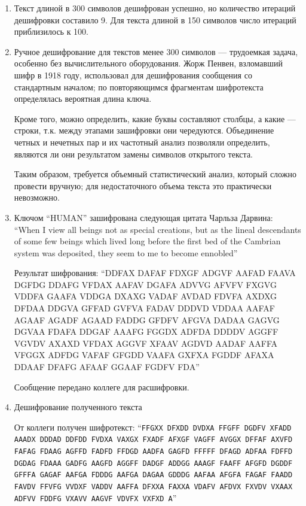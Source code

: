 \documentclass[a4paper, 14pt]{extarticle}
\begin{document}
\begin{enumerate}
    \item Текст длиной в 300 символов дешифрован успешно, но количество итераций дешифровки составило 9. Для текста длиной в 150 символов число итераций приблизилось к 100.

    \item Ручное дешифрование для текстов менее 300 символов --- трудоемкая задача, особенно без вычислительного оборудования. Жорж Пенвен, взломавший шифр в 1918 году, использовал для дешифрования сообщения со стандартным началом; по повторяющимся фрагментам шифротекста определялась вероятная длина ключа.
    
    Кроме того, можно определить, какие буквы составляют столбцы, а какие --- строки, т.к. между этапами зашифровки они чередуются. Объединение четных и нечетных пар и их частотный анализ позволяли определить, являются ли они результатом замены символов открытого текста.
    
    Таким образом, требуется объемный статистический анализ, который сложно провести вручную; для недостаточного объема текста это практически невозможно.

    \item Ключом ``HUMAN'' зашифрована следующая цитата Чарльза Дарвина:
    ``When I view all beings not as special creations, but as the lineal descendants of some few beings which lived long before the first bed of the Cambrian system was deposited, they seem to me to become ennobled''

    Результат шифрования: ``DDFAX DAFAF FDXGF ADGVF AAFAD FAAVA DGFDG DDAFG VFDAX AAFAV DGAFA ADVVG AFVFV FXGVG VDDFA GAAFA VDDGA DXAXG VADAF AVDAD FDVFA AXDXG DFDAA DDGVA GFFAD GVFVA FADAV DDDVD VDDAA AAFAF AGAAF AGADF AGAAD FADDG GFDFV AFGVA DADAA GAGVG DGVAA FDAFA DDGAF AAAFG FGGDX ADFDA DDDDV AGGFF VGVDV AXAXD VFDAX AGGVF XFAAV AGDVD AADAF AAFFA VFGGX ADFDG VAFAF GFGDD VAAFA GXFXA FGDDF AFAXA DDAAF DFAFG AFAAF GGAAF FGDFV FDA''

    Сообщение передано коллеге для расшифровки.

    \item Дешифрование полученного текста
        
        От коллеги получен шифротекст: ``\texttt{FFGXX DFXDD DVDXA FFGFF DGDFV XFADD AAADX DDDAD DDFDD FVDXA VAXGX FXADF AFXGF VAGFF AVGGX DFFAF AXVFD FAFAG FDAAG AGFFD FADFD FFDGD AADFA GAGFD FFFFF DFAGD ADFAA FDFFD DGDAG FDAAA GADFG AAGFD AGGFF DADGF ADDGG AAAGF FAAFF AFGFD DGDDF GFFFA GAGAF AAFGA FDDDG AAFGA DAGAA GDDDG AAFAA AFGFA FAGAF FAADD FAVDV FFVFG VVDXF VADDV AAFFA DFXXA FAXXA VDAFV AFDVX FXVDV VXAAX ADFVV FDDFG VXAVV AAGVF VDVFX VXFXD A}''


\end{enumerate}
\end{document}

